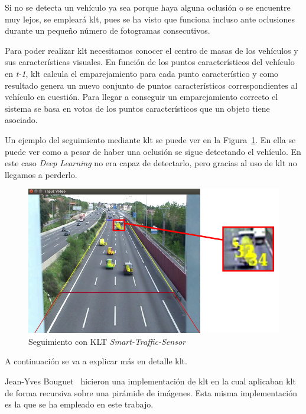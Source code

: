 Si no se detecta un vehículo ya sea porque haya alguna oclusión o se encuentre muy lejos, se empleará \acrshort{klt}, pues se ha visto que funciona incluso ante oclusiones durante un pequeño número de fotogramas consecutivos.

Para poder realizar \acrshort{klt} necesitamos conocer el centro de masas de los vehículos y sus características visuales. En función de los puntos característicos del vehículo en \textit{t-1}, \acrshort{klt} calcula el emparejamiento para cada punto característico y como resultado genera un nuevo conjunto de puntos característicos correspondientes al vehículo en cuestión. Para llegar a conseguir un emparejamiento correcto el sistema se basa en votos de los puntos característicos que un objeto tiene asociado. 

Un ejemplo del seguimiento mediante \acrshort{klt} se puede ver en la Figura~\ref{fig.klt_deteccion}. En ella se puede ver como a pesar de haber una oclusión se sigue detectando el vehículo. En este caso \textit{Deep Learning} no era capaz de detectarlo, pero gracias al uso de \acrshort{klt} no llegamos a perderlo.

 \begin{figure}[H] 
\begin{center}
   \includegraphics[scale=0.5]{figures/Diseno_global/klt_deteccion.png}
   \caption{Seguimiento con KLT \textit{Smart-Traffic-Sensor}}
	\label{fig.klt_deteccion}
\end{center}
\end{figure}

A continuación se va a explicar más en detalle \acrshort{klt}.

Jean-Yves Bouguet~\cite{klt_bouguet} hicieron una implementación de \acrshort{klt} en la cual aplicaban \acrshort{klt} de forma recursiva sobre una pirámide de imágenes. Esta misma implementación es la que se ha empleado en este trabajo. 

